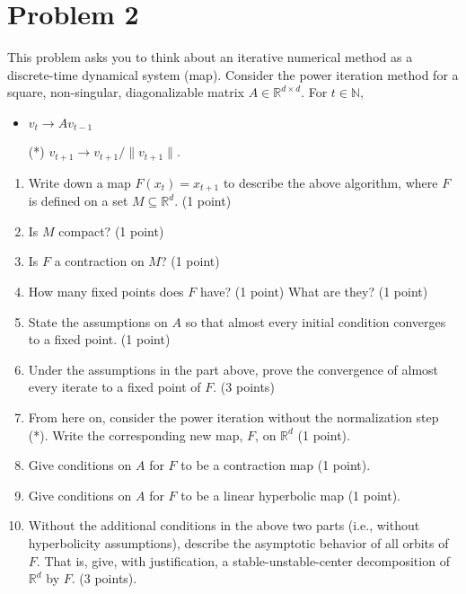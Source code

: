 \documentclass[12pt]{article}
\begin{document}
\section*{Problem 2}
This problem asks you to think about an iterative numerical method as a discrete-time dynamical system (map). Consider the power iteration method for a square, non-singular, diagonalizable matrix $A \in \mathbb{R}^{d\times d}.$ For $t \in \mathbb{N},$
\begin{itemize}
	\item $v_t \to Av_{t-1}$
	\item[(*)] $v_{t+1} \to v_{t+1}/\|v_{t+1}\|.$
\end{itemize}
\begin{enumerate}
	\item Write down a map $F(x_t) = x_{t+1}$ to describe the above algorithm, where $F$ is defined on a set $M \subseteq \mathbb{R}^d$. (1 point)
	\item Is $M$ compact? (1 point)
	\item Is $F$ a contraction on $M$? (1 point)
	\item How many fixed points does $F$ have? (1 point) What are they? (1 point)
	\item State the assumptions on $A$ so that almost every initial condition converges to a fixed point. (1 point)
	\item Under the assumptions in the part above, prove the convergence of almost every iterate to a fixed point of $F.$ (3 points)
	\item From here on, consider the power iteration without the normalization step (*). Write the corresponding new map, $F$, on $\mathbb{R}^d$ (1 point).
	\item Give conditions on $A$ for $F$ to be a contraction map (1 point).
	\item Give conditions on $A$ for $F$ to be a linear hyperbolic map (1 point).
	\item Without the additional conditions in the above two parts (i.e., without hyperbolicity assumptions), describe the asymptotic behavior of all orbits of $F.$ That is, give, with justification, a stable-unstable-center decomposition of $\mathbb{R}^d$ by $F.$ (3 points).

\end{enumerate}


\end{document}
